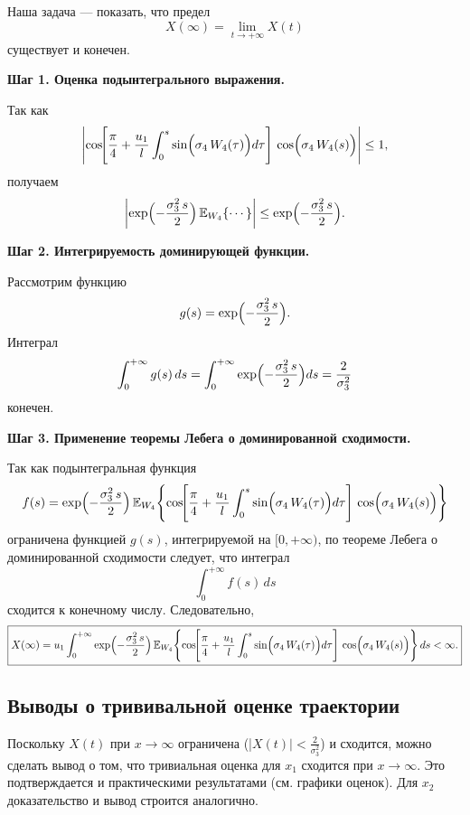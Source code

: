 \documentclass[12pt]{article}
\begin{document}
Наша задача --- показать, что предел
\[
	X(\infty)=\lim_{t\to+\infty}X(t)
\]
существует и конечен.

\textbf{Шаг 1. Оценка подынтегрального выражения.}

Так как
\[
	\left|\cos\!\Biggl[\frac{\pi}{4}+\frac{u_1}{l}\int_{0}^{s}\sin\Bigl(\sigma_4\,W_4(\tau)\Bigr)d\tau\Biggr]
	\,\cos\Bigl(\sigma_4\,W_4(s)\Bigr)\right| \le 1,
\]
получаем
\[
	\left|\exp\Bigl(-\frac{\sigma_3^2\,s}{2}\Bigr)
	\,\mathbb{E}_{W_4}\!\left\{\cdots\right\}\right|\le \exp\Bigl(-\frac{\sigma_3^2\,s}{2}\Bigr).
\]

\textbf{Шаг 2. Интегрируемость доминирующей функции.}

Рассмотрим функцию
\[
	g(s)=\exp\Bigl(-\frac{\sigma_3^2\, s}{2}\Bigr).
\]
Интеграл
\[
	\int_{0}^{+\infty}g(s)\,ds=\int_{0}^{+\infty}\exp\Bigl(-\frac{\sigma_3^2\, s}{2}\Bigr)ds = \frac{2}{\sigma_3^2}
\]
конечен.

\textbf{Шаг 3. Применение теоремы Лебега о доминированной сходимости.}

Так как подынтегральная функция
\[
	f(s)=\exp\Bigl(-\frac{\sigma_3^2\, s}{2}\Bigr)\,
	\mathbb{E}_{W_4}\!\left\{\cos\!\Biggl[\frac{\pi}{4}+\frac{u_1}{l}\int_{0}^{s}\sin\Bigl(\sigma_4\,W_4(\tau)\Bigr)d\tau\Biggr]\,\cos\Bigl(\sigma_4\,W_4(s)\Bigr)\right\}
\]
ограничена функцией $g(s)$, интегрируемой на $[0,+\infty)$, по теореме Лебега о доминированной сходимости следует, что интеграл
\[
	\int_{0}^{+\infty}f(s)\,ds
\]
сходится к конечному числу. Следовательно,
\[
	\boxed{X(\infty)= u_1\int_{0}^{+\infty}\exp\Bigl(-\frac{\sigma_3^2\, s}{2}\Bigr)\,
		\mathbb{E}_{W_4}\!\left\{\cos\!\Biggl[\frac{\pi}{4}+\frac{u_1}{l}\int_{0}^{s}\sin\Bigl(\sigma_4\,W_4(\tau)\Bigr)d\tau\Biggr]\,\cos\Bigl(\sigma_4\,W_4(s)\Bigr)\right\}ds < \infty.}
\]

\subsection{Выводы о трививальной оценке траектории}

Поскольку $X(t)$ при $x \to \infty$ ограничена (|$X(t)| < \frac{2}{\sigma_3^2}$) и сходится, можно сделать вывод о том, что тривиальная оценка для $x_1$ сходится при $x \to \infty$. Это подтверждается и практическими результатами (см. графики оценок). Для $x_2$ доказательство и вывод строится аналогично.
\end{document}
